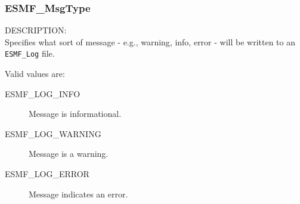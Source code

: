 
\subsubsection{ESMF\_MsgType}

\label{opt:msgtype}
{\sf DESCRIPTION:\\}
Specifies what sort of message - e.g., warning, info,
error - will be written to an {\tt ESMF\_Log} file.

Valid values are:
\begin{description}
   \item [ESMF\_LOG\_INFO] 
         Message is informational.
   \item [ESMF\_LOG\_WARNING]
         Message is a warning.
   \item [ESMF\_LOG\_ERROR]
         Message indicates an error.
\end{description}







